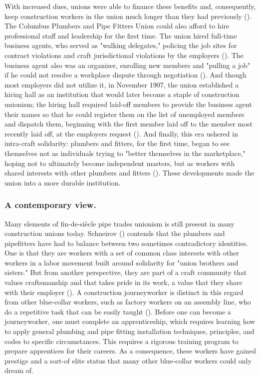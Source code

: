 \documentclass[12pt]{article}
\begin{document}
With increased dues, unions were able to finance these benefits and, consequently, keep construction workers in the union much longer than they had previously (\cite[59]{schneirovPrideSolidarityHistory1993}). The Columbus Plumbers and Pipe Fitters Union could also afford to hire professional staff and leadership for the first time. The union hired full-time business agents, who served as "walking delegates," policing the job sites for contract violations and craft jurisdictional violations by the employers (\citeyear[60]{schneirovPrideSolidarityHistory1993}). The business agent also was an organizer, enrolling new members and "pulling a job" if he could not resolve a workplace dispute through negotiation (\citeyear[60]{schneirovPrideSolidarityHistory1993}). And though most employers did not utilize it, in November 1907, the union established a hiring hall as an institution that would later become a staple of construction unionism; the hiring hall required laid-off members to provide the business agent their names so that he could register them on the list of unemployed members and dispatch them, beginning with the first member laid off to the member most recently laid off, at the employers request (\citeyear[60–61]{schneirovPrideSolidarityHistory1993}). And finally, this era ushered in intra-craft solidarity: plumbers and fitters, for the first time, began to see themselves not as individuals trying to "better themselves in the marketplace," hoping not to ultimately become independent masters, but as workers with shared interests with other plumbers and fitters (\citeyear[61]{schneirovPrideSolidarityHistory1993}). These developments made the union into a more durable institution.

\subsubsection{A contemporary view.}

Many elements of fin-de-si\`{e}cle pipe trades unionism is still present in many construction unions today. Schneirov (\citeyear{schneirovPrideSolidarityHistory1993}) contends that the plumbers and pipefitters have had to balance between two sometimes contradictory identities. One is that they are workers with a set of common class interests with other workers in a labor movement built around solidarity for "union brothers and sisters." But from another perspective, they are part of a craft community that values craftsmanship and that takes pride in its work, a value that they share with their employer (\cite[3--4]{schneirovPrideSolidarityHistory1993}). A construction journeyworker is distinct in this regard from other blue-collar workers, such as factory workers on an assembly line, who do a repetitive task that can be easily taught (\cite[5]{schneirovPrideSolidarityHistory1993}). Before one can become a journeyworker, one must complete an apprenticeship, which requires learning how to apply general plumbing and pipe fitting installation techniques, principles, and codes to specific circumstances. This requires a rigorous training program to prepare apprentices for their careers. As a consequence, these workers have gained prestige and a sort-of elite status that many other blue-collar workers could only dream of.
\end{document}
